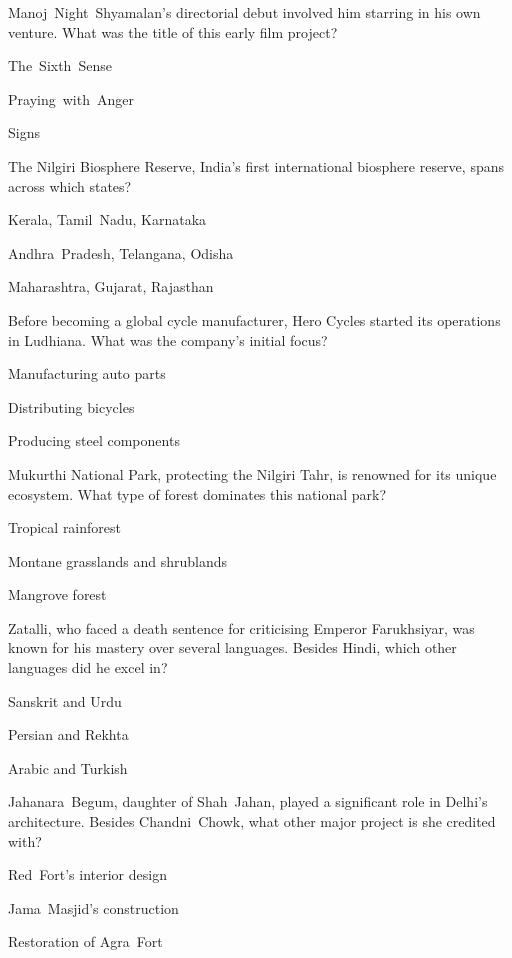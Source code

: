 
\begin{enhancedmcq}{Manoj Night Shyamalan's directorial debut involved him starring in his own venture. What was the title of this early film project?}
\item The Sixth Sense
\item Praying with Anger
\item Signs

\end{enhancedmcq}
\begin{enhancedmcq}{The Nilgiri Biosphere Reserve, India's first international biosphere reserve, spans across which states?}
\item Kerala, Tamil Nadu, Karnataka
\item Andhra Pradesh, Telangana, Odisha
\item Maharashtra, Gujarat, Rajasthan

\end{enhancedmcq}
\begin{enhancedmcq}{Before becoming a global cycle manufacturer, Hero Cycles started its operations in Ludhiana. What was the company's initial focus?}
\item Manufacturing auto parts
\item Distributing bicycles
\item Producing steel components

\end{enhancedmcq}
\begin{enhancedmcq}{Mukurthi National Park, protecting the Nilgiri Tahr, is renowned for its unique ecosystem. What type of forest dominates this national park?}
\item Tropical rainforest
\item Montane grasslands and shrublands
\item Mangrove forest

\end{enhancedmcq}
\begin{enhancedmcq}{Zatalli, who faced a death sentence for criticising Emperor Farukhsiyar, was known for his mastery over several languages. Besides Hindi, which other languages did he excel in?}
\item Sanskrit and Urdu
\item Persian and Rekhta
\item Arabic and Turkish

\end{enhancedmcq}
\begin{enhancedmcq}{Jahanara Begum, daughter of Shah Jahan, played a significant role in Delhi's architecture. Besides Chandni Chowk, what other major project is she credited with?}
\item Red Fort's interior design
\item Jama Masjid's construction
\item Restoration of Agra Fort

\end{enhancedmcq}
